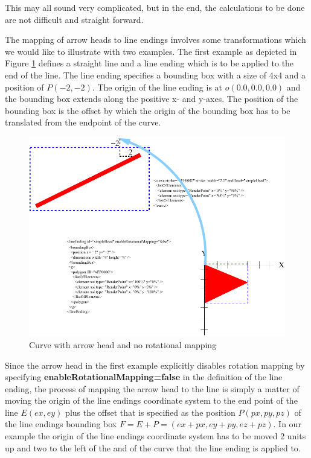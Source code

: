 This may all sound very complicated, but in the end, the calculations to be done are not difficult and straight forward. 

The mapping of arrow heads to line endings involves some transformations which we would like to illustrate with two examples.
The first example as depicted in Figure \ref{fig:2ArrowHeadMapping} defines a straight line and a line ending which is to be applied
to the end of the line. The line ending specifies a bounding box with a size of 4x4 and a position of $P(-2,-2)$. 
The origin of the line ending is at $o(0.0,0.0,0.0)$ and the bounding box extends along the positive x- and y-axes.
The position of the bounding box is the offset by which the origin of the bounding box has to be translated from the endpoint of the curve.

\begin{figure}[!h]
\begin{center}
\includegraphics{figures/ArrowHeadMapping2.pdf}
\end{center}
\caption{Curve with arrow head and no rotational mapping} \label{fig:2ArrowHeadMapping}
\end{figure}

Since the arrow head in the first example explicitly disables rotation mapping by specifying \textbf{enableRotationalMapping=false}
in the definition of the line ending, the process of mapping the arrow head to the line is simply a matter of moving the origin of 
the line endings coordinate system to the end point of the line $E(ex,ey)$ plus the offset that is specified as the position $P(px,py,pz)$ of the line endings bounding box $F=E+P=(ex+px,ey+py,ez+pz)$. In our example the origin of the line endings coordinate system has to be moved 2 units up and two to the left of the and of the curve that the line ending is applied to.


